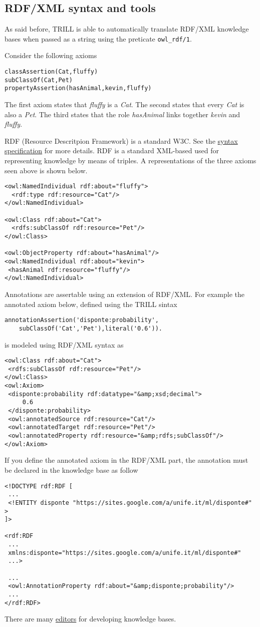 \subsection{RDF/XML syntax and tools}
\label{rdfxml-syn}
As said before, TRILL is able to automatically translate RDF/XML knowledge bases when passed as a string using 
the preticate \verb|owl_rdf/1|.

Consider the following axioms 

\begin{verbatim}
classAssertion(Cat,fluffy)
subClassOf(Cat,Pet)
propertyAssertion(hasAnimal,kevin,fluffy)
\end{verbatim}

The first axiom states that \textit{fluffy} is a \textit{Cat}. The second states that every \textit{Cat} is also a \textit{Pet}. The third states that the role \textit{hasAnimal} links together \textit{kevin} and \textit{fluffy}.

RDF (Resource Descritpion Framework) is a standard W3C. See the \href{http://www.w3.org/TR/REC-rdf-syntax/}{syntax specification} for more details.
RDF is a standard XML-based used for representing knowledge by means of triples.
A representations of the three axioms seen above is shown below.
\begin{verbatim}
<owl:NamedIndividual rdf:about="fluffy">
  <rdf:type rdf:resource="Cat"/>
</owl:NamedIndividual>

<owl:Class rdf:about="Cat">
  <rdfs:subClassOf rdf:resource="Pet"/>
</owl:Class>

<owl:ObjectProperty rdf:about="hasAnimal"/>
<owl:NamedIndividual rdf:about="kevin">
 <hasAnimal rdf:resource="fluffy"/>
</owl:NamedIndividual>
\end{verbatim}

Annotations are assertable using an extension of RDF/XML. For example the annotated axiom below, defined using the TRILL sintax
\begin{verbatim}
annotationAssertion('disponte:probability',
    subClassOf('Cat','Pet'),literal('0.6')).
\end{verbatim}
is modeled using RDF/XML syntax as
\begin{verbatim}
<owl:Class rdf:about="Cat">
 <rdfs:subClassOf rdf:resource="Pet"/>
</owl:Class>
<owl:Axiom>
 <disponte:probability rdf:datatype="&amp;xsd;decimal">
     0.6
 </disponte:probability>
 <owl:annotatedSource rdf:resource="Cat"/>
 <owl:annotatedTarget rdf:resource="Pet"/>
 <owl:annotatedProperty rdf:resource="&amp;rdfs;subClassOf"/>
</owl:Axiom>
\end{verbatim}
If you define the annotated axiom in the RDF/XML part, the annotation must be declared in the knowledge base as follow
\begin{verbatim}
<!DOCTYPE rdf:RDF [
 ...
 <!ENTITY disponte "https://sites.google.com/a/unife.it/ml/disponte#" >
]>

<rdf:RDF
 ...
 xmlns:disponte="https://sites.google.com/a/unife.it/ml/disponte#"
 ...>

 ...
 <owl:AnnotationProperty rdf:about="&amp;disponte;probability"/>
 ...
</rdf:RDF>
\end{verbatim}

There are many \href{http://www.w3.org/2001/sw/wiki/Category:Editor}{editors} for developing knowledge bases.
